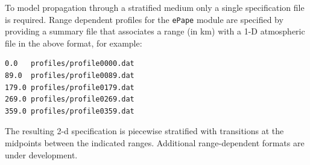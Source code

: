 To model propagation through a stratified medium only a single specification file is required. Range dependent profiles for the \verb"ePape" module are specified by providing a summary file that associates a range (in km) with a 1-D atmospheric file in the above format, for example:
\begin{verbatim}
0.0   profiles/profile0000.dat
89.0  profiles/profile0089.dat
179.0 profiles/profile0179.dat
269.0 profiles/profile0269.dat
359.0 profiles/profile0359.dat
\end{verbatim}
The resulting 2-d specification is piecewise stratified with transitions at the midpoints between the indicated ranges. Additional range-dependent formats are under development.